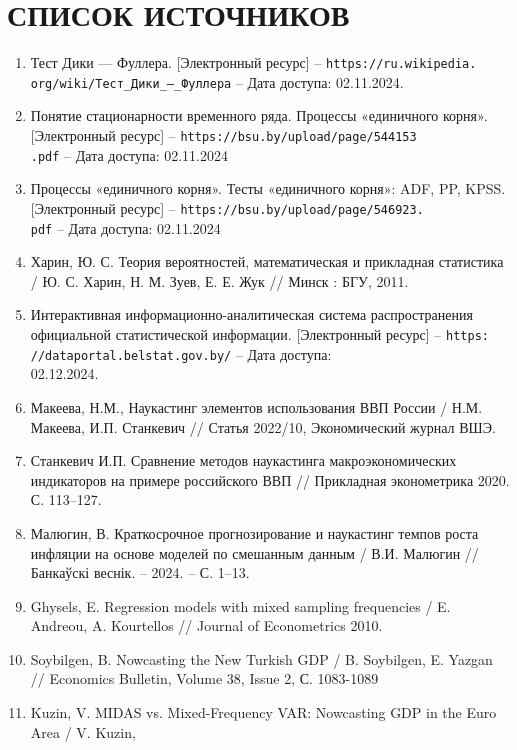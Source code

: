 \documentclass[a4paper, 14pt]{extreport}
\numberwithin{equation}{subsection}
\numberwithin{equation}{section}
\begin{document}
	\chapter*{СПИСОК ИСТОЧНИКОВ}
	\begin{enumerate}
		\item Тест Дики — Фуллера. [Электронный ресурс] – \texttt{https://ru.wikipedia.\\org/wiki/Тест\_Дики\_—\_Фуллера} – Дата доступа: 02.11.2024.
		\item Понятие стационарности временного ряда. Процессы «единичного корня».
		[Электронный ресурс] – \texttt{https://bsu.by/upload/page/544153\\.pdf} – Дата
		доступа: 02.11.2024
		\item Процессы «единичного корня».
		Тесты «единичного корня»: ADF, PP, KPSS.
		[Электронный ресурс] – \texttt{https://bsu.by/upload/page/546923.\\pdf} – Дата
		доступа: 02.11.2024
		\item Харин, Ю. С. Теория вероятностей,
		математическая
		и прикладная статистика / Ю. С. Харин, Н. М. Зуев, Е. Е. Жук // Минск : БГУ, 2011. 
		\item Интерактивная информационно-аналитическая система распространения
		официальной статистической информации. [Электронный ресурс] – \texttt{https:
		//dataportal.belstat.gov.by/} – Дата доступа: \\ 02.12.2024.
		\item Макеева, Н.М., Наукастинг элементов использования ВВП России / Н.М. Макеева, И.П. Станкевич // Статья 2022/10, Экономический журнал ВШЭ.
		\item Станкевич И.П. Сравнение методов наукастинга макроэкономических индикаторов на примере российского ВВП // Прикладная эконометрика 2020. С. 113–127.
		\item Малюгин, В. Краткосрочное прогнозирование и наукастинг темпов роста инфляции на основе моделей по смешанным данным / В.И. Малюгин // Банкаўскі веснік. – 2024. – С. 1–13.
		\item Ghysels, E. Regression models with mixed sampling frequencies /  E. Andreou, A. Kourtellos // Journal of Econometrics 2010.
		\item Soybilgen, B. Nowcasting the New Turkish GDP / B. Soybilgen, E. Yazgan // Economics Bulletin, Volume 38, Issue 2, 
		С. 1083-1089
		\item Kuzin, V. MIDAS vs. Mixed-Frequency VAR:
		Nowcasting GDP in the Euro Area / V. Kuzin,

\end{enumerate}
\end{document}
